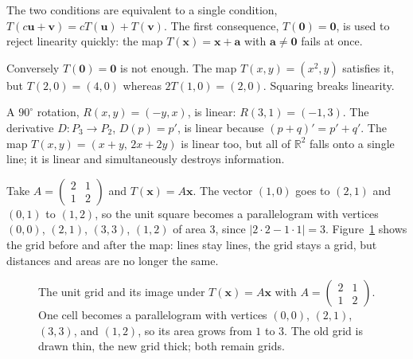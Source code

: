The two conditions are equivalent to a single condition,
$T(c\mathbf{u}+\mathbf{v})=cT(\mathbf{u})+T(\mathbf{v})$. The first consequence,
$T(\mathbf{0})=\mathbf{0}$, is used to reject linearity quickly: the map
$T(\mathbf{x})=\mathbf{x}+\mathbf{a}$ with $\mathbf{a}\neq\mathbf{0}$ fails at once.

Conversely $T(\mathbf{0})=\mathbf{0}$ is not enough. The map $T(x,y)=(x^{2},y)$ satisfies it,
but
$T(2,0)=(4,0)$ whereas $2T(1,0)=(2,0)$. Squaring breaks linearity.

A $90^{\circ}$ rotation, $R(x,y)=(-y,x)$, is linear: $R(3,1)=(-1,3)$. The derivative $D\colon P_{3}\to P_{2}$, $D(p)=p'$, is linear because $(p+q)'=p'+q'$. The map $T(x,y)=(x+y,\,2x+2y)$ is linear too, but all of $\mathbb{R}^{2}$ falls onto a single line; it is linear and simultaneously destroys information.

Take
$A=\begin{pmatrix}2&1\\1&2\end{pmatrix}$ and $T(\mathbf{x})=A\mathbf{x}$. The vector $(1,0)$ goes
to $(2,1)$ and $(0,1)$ to $(1,2)$, so the unit square becomes a parallelogram with
vertices
$(0,0)$, $(2,1)$, $(3,3)$, $(1,2)$ of area $3$, since $|2\cdot2-1\cdot1|=3$.
Figure~\ref{fig:kisi-07} shows the grid before and after the map: lines stay lines, the grid
stays a grid, but distances and areas are no longer the same.

\begin{figure}[htbp]
\centering
{}
\caption{The unit grid and its image under $T(\mathbf{x})=A\mathbf{x}$ with
$A=\begin{pmatrix}2&1\\1&2\end{pmatrix}$. One cell becomes a parallelogram with
vertices $(0,0)$, $(2,1)$, $(3,3)$, and $(1,2)$, so its area grows from $1$ to $3$.
The old grid is drawn thin, the new grid thick; both remain grids.}
\label{fig:kisi-07}
\end{figure}

